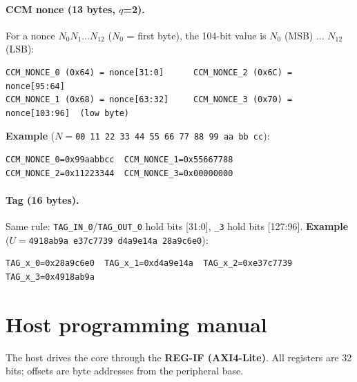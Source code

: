 \documentclass[11pt,a4paper]{article}
\newcommand{\reg}[1]{\texttt{#1}}
\begin{document}
\paragraph{CCM nonce (13 bytes, \(q\)=2).} For a nonce \(N_0 N_1 \dots N_{12}\) (\(N_0\) =
first byte), the 104-bit value is \(N_0\) (MSB) $\dots$ \(N_{12}\) (LSB):
\begin{lstlisting}
CCM_NONCE_0 (0x64) = nonce[31:0]      CCM_NONCE_2 (0x6C) = nonce[95:64]
CCM_NONCE_1 (0x68) = nonce[63:32]     CCM_NONCE_3 (0x70) = nonce[103:96]  (low byte)
\end{lstlisting}
\textbf{Example} (\(N=\)\texttt{00\,11\,22\,33\,44\,55\,66\,77\,88\,99\,aa\,bb\,cc}):
\begin{lstlisting}
CCM_NONCE_0=0x99aabbcc  CCM_NONCE_1=0x55667788
CCM_NONCE_2=0x11223344  CCM_NONCE_3=0x00000000
\end{lstlisting}

\paragraph{Tag (16 bytes).} Same rule: \reg{TAG\_IN\_0}/\reg{TAG\_OUT\_0} hold bits [31:0],
\reg{\_3} hold bits [127:96]. \textbf{Example} (\(U=\)\texttt{4918ab9a\,e37c7739\,d4a9e14a\,28a9c6e0}):
\begin{lstlisting}
TAG_x_0=0x28a9c6e0  TAG_x_1=0xd4a9e14a  TAG_x_2=0xe37c7739  TAG_x_3=0x4918ab9a
\end{lstlisting}

\section{Host programming manual}

The host drives the core through the \textbf{REG-IF (AXI4-Lite)}. All registers are 32 bits;
offsets are byte addresses from the peripheral base.
\end{document}
